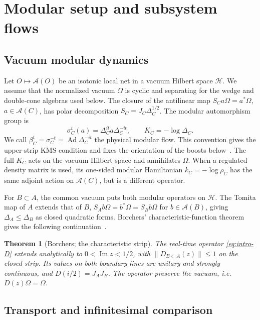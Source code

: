 \documentclass[a4paper,11pt]{article}
\newtheorem{theorem}{Theorem}
\theoremstyle{definition}
\begin{document}
\section{Modular setup and subsystem flows}\label{sec:setup}

\subsection{Vacuum modular dynamics}

Let $O\mapsto\mathcal A(O)$ be an isotonic local net in a vacuum Hilbert space $\mathcal H$. We assume that the normalized vacuum $\Omega$ is cyclic and separating for the wedge and double-cone algebras used below. The closure of the antilinear map $S_Ca\Omega=a^*\Omega$, $a\in\mathcal A(C)$, has polar decomposition $S_C=J_C\Delta_C^{1/2}$. The modular automorphism group is
\begin{equation}
 \sigma_C^t(a)=\Delta_C^{it}a\Delta_C^{-it},\qquad K_C=-\log\Delta_C.
 \label{eq:modular-flow}
\end{equation}
We call $\beta_C^t=\sigma_C^{-t}=\operatorname{Ad}\Delta_C^{-it}$ the physical modular flow. This convention gives the upper-strip KMS condition and fixes the orientation of the boosts below~\cite{revolutionizing,companion}. The full $K_C$ acts on the vacuum Hilbert space and annihilates $\Omega$. When a regulated density matrix is used, its one-sided modular Hamiltonian $k_C=-\log\rho_C$ has the same adjoint action on $\mathcal A(C)$, but is a different operator.

For $B\subset A$, the common vacuum puts both modular operators on $\mathcal H$. The Tomita map of $A$ extends that of $B$, $S_Ab\Omega=b^*\Omega=S_Bb\Omega$ for $b\in\mathcal A(B)$, giving $\Delta_A\le\Delta_B$ as closed quadratic forms. Borchers' characteristic-function theorem gives the following continuation~\cite{revolutionizing}.

\begin{theorem}[Borchers; the characteristic strip]\label{prop:strip}
The real-time operator \eqref{eq:intro-D} extends analytically to $0<\operatorname{Im}z<1/2$, with $\|D_{B\subset A}(z)\|\le1$ on the closed strip. Its values on both boundary lines are unitary and strongly continuous, and $D(i/2)=J_AJ_B$. The operator preserve the vacuum, i.e. $D(z)\Omega=\Omega$.
\end{theorem}

\subsection{Transport and infinitesimal comparison}
\end{document}
